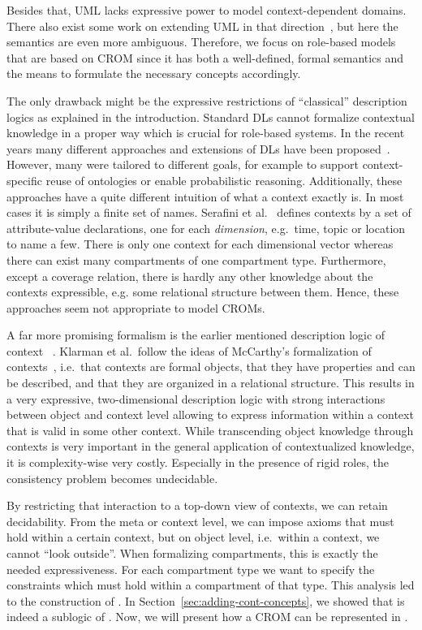 Besides that, UML lacks expressive power to model context-dependent domains. There also exist some
work on extending UML in that direction~\cite{ShB-ICMB05}, but here the semantics are even more ambiguous.
Therefore, we focus on role-based models that are based on CROM since it has both a well-defined,
formal semantics and the means to formulate the necessary concepts accordingly.

The only drawback might be the expressive restrictions of ``classical'' description logics as
explained in the introduction. Standard DLs cannot formalize contextual knowledge in a proper way
which is crucial for role-based systems.  In the recent years many different approaches and
extensions of DLs have been proposed~\cite{BoGH-WS04, BeAF-ADVIS06, BaVS-ModOnt09, BaKP-JWS12,
  CePe-IJCAR14, CePe-JAR17}.  However, many were tailored to different goals, for example to support
context-specific reuse of ontologies or enable probabilistic reasoning. Additionally, these
approaches have a quite different intuition of what a context exactly is. In most cases it is simply
a finite set of names.  Serafini et al.~\cite{SeHo-JWS12} defines contexts by a set of
attribute-value declarations, one for each \emph{dimension}, e.g.\ time, topic or location to name a
few. There is only one context for each dimensional vector whereas there can exist many compartments
of one compartment type.  Furthermore, except a coverage relation, there is hardly any other
knowledge about the contexts expressible, e.g. some relational structure between them.  Hence, these
approaches seem not appropriate to model CROMs.

A far more promising formalism is the earlier mentioned description logic of context
\klarALC~\cite{KG-JELIA10, KG16}. Klarman et al.\ follow the ideas of McCarthy's formalization of
contexts~\cite{McC-ACM87,McC-IJCAI93}, i.e.\ that contexts are formal objects, that they have
properties and can be described, and that they are organized in a relational structure.  This
results in a very expressive, two-dimensional description logic with strong interactions between
object and context level allowing to express information within a context that is valid in some
other context.  While transcending object knowledge through contexts is very important in
the general application of contextualized knowledge, it is complexity-wise very costly. Especially
in the presence of rigid roles, the consistency problem becomes undecidable.

By restricting that interaction to a top-down view of contexts, we can retain decidability. From the
meta or context level, we can impose axioms that must hold within a certain context, but on object
level, i.e.\ within a context, we cannot ``look outside''.
%
When formalizing compartments, this is exactly the needed expressiveness. For each compartment type
we want to specify the constraints which must hold within a compartment of that type.
%
This analysis led to the construction of \LMLO.
In Section~\ref{sec:adding-cont-concepts}, we showed that \ALCALC is indeed a sublogic of \klarALC.
Now, we will present how a CROM can be represented in \LMLO.


